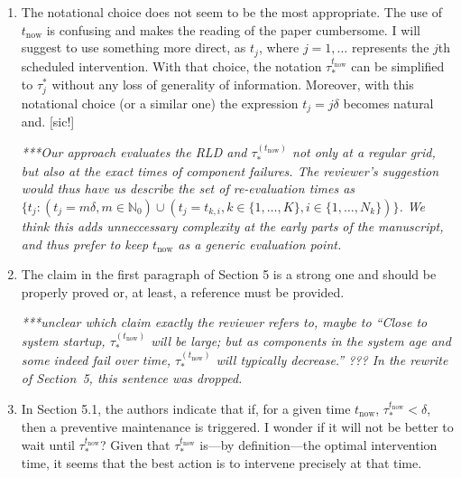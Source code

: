 \documentclass[authoryear]{elsarticle}
\newcommand{\naturals}{\mathbb{N}}
\def\tnow{t_\text{now}}
\newcommand{\tausnow}{\tau_*^{(\tnow)}}
\begin{document}
\begin{enumerate}
\item The notational choice does not seem to be the most appropriate. The use of $\tnow$ is confusing and makes the reading of the paper cumbersome. I will suggest to use something more direct, as $t_j$, where $j=1,\ldots$ represents the $j$th scheduled intervention. With that choice, the notation $\tau^{\tnow}_*$ can be simplified to $\tau^*_j$ without any loss of generality of information. Moreover, with this notational choice (or a similar one) the expression $t_j=j \delta$ becomes natural and. [sic!]

\smallskip

\emph{***Our approach evaluates the RLD and $\tausnow$ not only at a regular grid,
but also at the exact times of component failures.
The reviewer's suggestion would thus have us describe the set of re-evaluation times as
$\big\{ t_j: (t_j = m\delta, m \in \naturals_0) \cup (t_j = t_{k,i}, k \in \{1,\ldots,K\}, i \in \{1,\ldots, N_k\}) \big\}$.
We think this adds unneccessary complexity at the early parts of the manuscript,
and thus prefer to keep $\tnow$ as a generic evaluation point.}

\item The claim in the first paragraph of Section 5 is a strong one and should be properly proved or, at least, a reference must be provided.

\smallskip

\emph{***unclear which claim exactly the reviewer refers to, maybe to
``Close to system startup, $\tausnow$ will be large;
but as components in the system age and some indeed fail over time, $\tausnow$ will typically decrease.'' ???
In the rewrite of Section~5, this sentence was dropped.}

\item In Section 5.1, the authors indicate that if, for a given time $\tnow$, $\tau_*^{\tnow}<\delta$, then a preventive maintenance is triggered. I wonder if it will not be better to wait until $\tau_*^{\tnow}$? Given that $\tau_*^{\tnow}$ is---by definition---the optimal intervention time, it seems that the best action is to intervene precisely at that time.


\end{enumerate}
\end{document}
